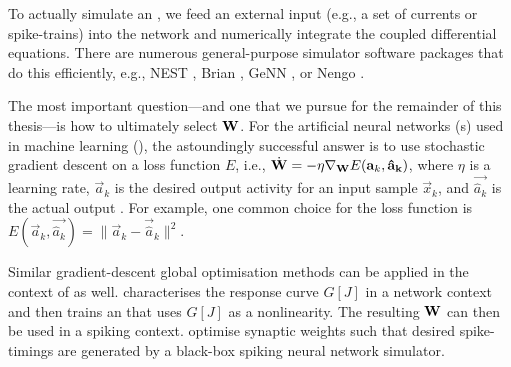 To actually simulate an \SNN, we feed an external input (e.g., a set of currents or spike-trains) into the network and numerically integrate the coupled differential equations.
There are numerous general-purpose simulator software packages that do this efficiently, e.g., NEST \citep{gewaltig2007nest}, Brian \citep{stimberg2019brian}, GeNN \citep{yavuz2016genn}, or Nengo \citep{bekolay2014nengo}.

The most important question---and one that we pursue for the remainder of this thesis---is how to ultimately select $\mathbf{W}$.
For the artificial neural networks ({\ANN}s) used in machine learning (), the astoundingly successful answer is to use stochastic gradient descent on a loss function $E$, i.e., $\dot{\mathbf{W}} = -\eta \nabla_{\mathbf{W}} E(\mathbf{a}_k, \mathbf{\hat a_k})$, where $\eta$ is a learning rate, $\vec a_k$ is the desired output activity for an input sample $\vec x_k$, and $\vec{\hat a_k}$ is the actual output \citep{lecun2015deep}.
For example, one common choice for the loss function is $E(\vec a_k, \vec {\hat a_k}) = \|\vec a_k - \vec{\hat a}_k\|^2$.

Similar gradient-descent global optimisation methods can be applied in the context of \SNNpl as well.
 characterises the \LIF response curve $G[J]$ in a network context and then trains an \ANN that uses $G[J]$ as a nonlinearity.
The resulting $\mathbf{W}$ can then be used in a spiking context.
 optimise synaptic weights such that desired spike-timings are generated by a black-box spiking neural network simulator.



